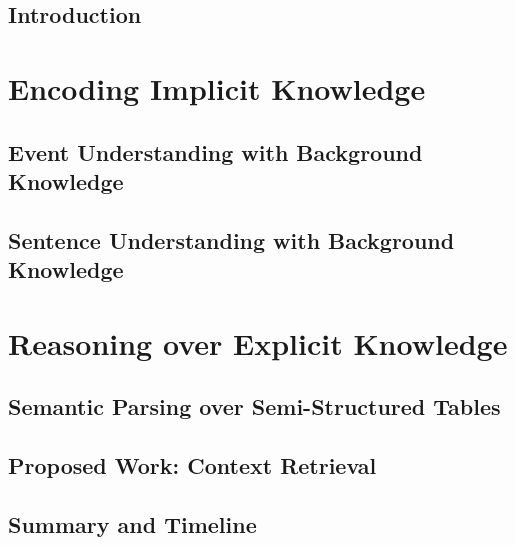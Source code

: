 \documentclass[12pt]{cmuthesis}
\begin{document}
\chapter{Introduction}
\label{chapter:introduction}

\part{Encoding Implicit Knowledge}
\chapter{Event Understanding with Background Knowledge}
\label{chapter:nem}

\chapter{Sentence Understanding with Background Knowledge}
\label{chapter:ontolstm}

\part{Reasoning over Explicit Knowledge}
\chapter{Semantic Parsing over Semi-Structured Tables}
\label{chapter:neural_semantic_parsing}

\chapter{Proposed Work: Context Retrieval}
\label{chapter:memnet_qa}

\chapter{Summary and Timeline}


%

\backmatter


\renewcommand{\bibsection}{\chapter{\bibname}}

\end{document}

